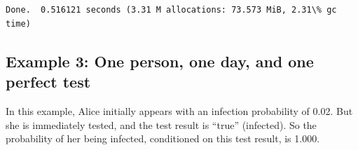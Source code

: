 \documentclass[11pt]{article}
\begin{document}
    \begin{center}
    \end{center}
    { \hspace*{\fill} \\}
    
    \begin{Verbatim}[commandchars=\\\{\}]

Done.  0.516121 seconds (3.31 M allocations: 73.573 MiB, 2.31\% gc time)
    \end{Verbatim}
\newpage
    \hypertarget{example-3-one-person-one-day-and-one-perfect-test}{%
\subsection{Example 3: One person, one day, and one perfect
test}\label{example-3-one-person-one-day-and-one-perfect-test}}

In this example, Alice initially appears with an infection probability
of 0.02. But she is immediately tested, and the test result is ``true''
(infected). So the probability of her being infected, conditioned on
this test result, is 1.000.
\end{document}
